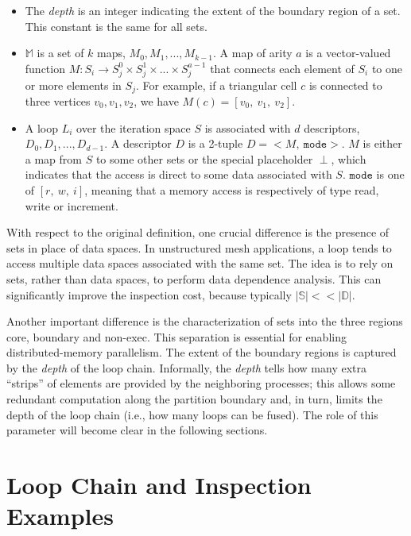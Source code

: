 \begin{itemize}
\item The {\em depth} is an integer indicating the extent of the boundary region of a set. This constant is the same for all sets. 

\item $\mathbb{M}$ is a set of $k$ maps, $M_0, M_1, ..., M_{k-1}$. A map of arity $a$ is a vector-valued function $M : S_i \rightarrow S_j^0 \times S_j^1 \times ... \times S_j^{a-1}$ that connects each element of $S_i$ to one or more elements in $S_j$. For example, if a triangular cell $c$ is connected to three vertices $v_0,v_1,v_2$, we have $M(c) = [v_0,\ v_1,\ v_2]$. 

\item A loop $L_i$ over the iteration space $S$ is associated with $d$ descriptors, $D_0, D_1, ..., D_{d-1}$. A descriptor $D$ is a 2-tuple $D = {<}M,\ \texttt{mode}{>}$. $M$ is either a map from $S$ to some other sets or the special placeholder $\perp$, which indicates that the access is direct to some data associated with $S$. $\texttt{mode}$ is one of $[r,\ w,\ i]$, meaning that a memory access is respectively of type read, write or increment.
\end{itemize}

With respect to the original definition, one crucial difference is the presence of sets in place of data spaces. In unstructured mesh applications, a loop tends to access multiple data spaces associated with the same set. The idea is to rely on sets, rather than data spaces, to perform data dependence analysis. This can significantly improve the inspection cost, because typically $|\mathbb{S}| << |\mathbb{D}|$. 

Another important difference is the characterization of sets into the three regions core, boundary and non-exec. This separation is essential for enabling distributed-memory parallelism. The extent of the boundary regions is captured by the {\em depth} of the loop chain. Informally, the {\em depth} tells how many extra ``strips'' of elements are provided by the neighboring processes; this allows some redundant computation along the partition boundary and, in turn, limits the depth of the loop chain (i.e., how many loops can be fused). The role of this parameter will become clear in the following sections. 


\section{Loop Chain and Inspection Examples}
\label{sec:tiling:examples}

